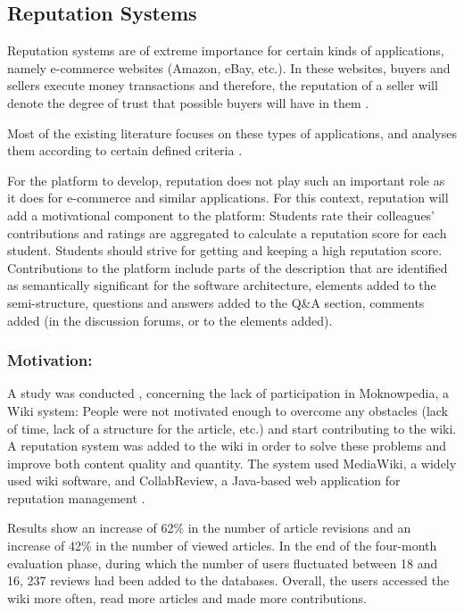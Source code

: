 \subsection{Reputation Systems}
\label{repsys}
Reputation systems are of extreme importance for certain kinds of applications, namely e-commerce websites (Amazon, eBay, etc.). In these websites, buyers and sellers execute money transactions and therefore, the reputation of a seller will denote the degree of trust that possible buyers will have in them \cite{vavilis2014reference}.

Most of the existing literature focuses on these types of applications, and analyses them according to certain defined criteria \cite{vavilis2014reference,liu2010evaluation}.

For the platform to develop, reputation does not play such an important role as it does for e-commerce and similar applications. For this context, reputation will add a motivational component to the platform: Students rate their colleagues' contributions and ratings are aggregated to calculate a reputation score for each student. Students should strive for getting and keeping a high reputation score. Contributions to the platform include parts of the description that are identified as semantically significant for the software architecture, elements added to the semi-structure, questions and answers added to the Q\&A section, comments added (in the discussion forums, or to the elements added).

\subsubsection{Motivation:}

A study was conducted \cite{dencheva2011dynamic}, concerning the lack of participation in Moknowpedia, a Wiki system: People were not motivated enough to overcome any obstacles (lack of time, lack of a structure for the article, etc.) and start contributing to the wiki. A reputation system was added to the wiki in order to solve these problems and improve both content quality and quantity. The system used MediaWiki, a widely used wiki software, and CollabReview, a Java-based web application for reputation management \cite{prause2008approach}. 

Results show an increase of 62\% in the number of article revisions and an increase of 42\% in the number of viewed articles. In the end of the four-month evaluation phase, during which the number of users fluctuated between 18 and 16, 237 reviews had been added to the databases. Overall, the users accessed the wiki more often, read more articles and made more contributions. 

